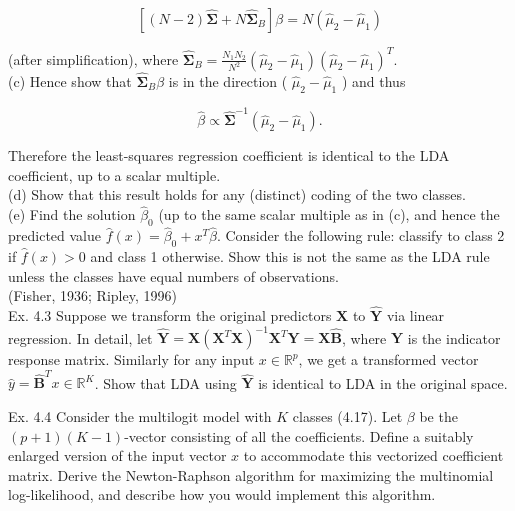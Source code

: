 \documentclass[10pt]{article}
\begin{document}
\begin{equation*}
\left[(N-2) \hat{\boldsymbol{\Sigma}}+N \hat{\boldsymbol{\Sigma}}_{B}\right] \beta=N\left(\hat{\mu}_{2}-\hat{\mu}_{1}\right) \tag{4.56}
\end{equation*}


(after simplification), where $\hat{\boldsymbol{\Sigma}}_{B}=\frac{N_{1} N_{2}}{N^{2}}\left(\hat{\mu}_{2}-\hat{\mu}_{1}\right)\left(\hat{\mu}_{2}-\hat{\mu}_{1}\right)^{T}$.\\
(c) Hence show that $\hat{\boldsymbol{\Sigma}}_{B} \beta$ is in the direction ( $\hat{\mu}_{2}-\hat{\mu}_{1}$ ) and thus


\begin{equation*}
\hat{\beta} \propto \hat{\boldsymbol{\Sigma}}^{-1}\left(\hat{\mu}_{2}-\hat{\mu}_{1}\right) . \tag{4.57}
\end{equation*}


Therefore the least-squares regression coefficient is identical to the LDA coefficient, up to a scalar multiple.\\
(d) Show that this result holds for any (distinct) coding of the two classes.\\
(e) Find the solution $\hat{\beta}_{0}$ (up to the same scalar multiple as in (c), and hence the predicted value $\hat{f}(x)=\hat{\beta}_{0}+x^{T} \hat{\beta}$. Consider the following rule: classify to class 2 if $\hat{f}(x)>0$ and class 1 otherwise. Show this is not the same as the LDA rule unless the classes have equal numbers of observations.\\
(Fisher, 1936; Ripley, 1996)\\
Ex. 4.3 Suppose we transform the original predictors $\mathbf{X}$ to $\hat{\mathbf{Y}}$ via linear regression. In detail, let $\hat{\mathbf{Y}}=\mathbf{X}\left(\mathbf{X}^{T} \mathbf{X}\right)^{-1} \mathbf{X}^{T} \mathbf{Y}=\mathbf{X} \hat{\mathbf{B}}$, where $\mathbf{Y}$ is the indicator response matrix. Similarly for any input $x \in \mathbb{R}^{p}$, we get a transformed vector $\hat{y}=\hat{\mathbf{B}}^{T} x \in \mathbb{R}^{K}$. Show that LDA using $\hat{\mathbf{Y}}$ is identical to LDA in the original space.

Ex. 4.4 Consider the multilogit model with $K$ classes (4.17). Let $\beta$ be the $(p+1)(K-1)$-vector consisting of all the coefficients. Define a suitably enlarged version of the input vector $x$ to accommodate this vectorized coefficient matrix. Derive the Newton-Raphson algorithm for maximizing the multinomial log-likelihood, and describe how you would implement this algorithm.
\end{document}
